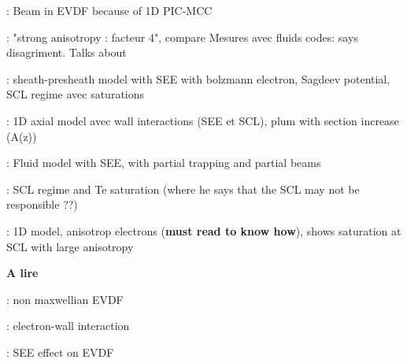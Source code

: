 \citet{sydorenko2006a} : Beam in EVDF because of 1D PIC-MCC 

\citet{raitses2006} : "strong anisotropy : facteur 4",  compare Mesures avec fluids codes: says disagriment. Talks about 

\citet{ahedo2002} : sheath-presheath model with SEE with bolzmann electron, Sagdeev potential, SCL regime avec saturations 

\citet{ahedo2003} : 1D axial model avec wall interactions (SEE et SCL), plum with section increase (A(z)) 

\citet{ahedo2005} : Fluid model with SEE, with partial trapping and partial beams

\citet{raitses2005} : SCL regime and Te saturation (where he says that the SCL may not be responsible ??)

\citet{barral2003a} : 1D model, anisotrop electrons ({\bf must read to know how}), shows saturation at SCL with large anisotropy

{\bf \Large A lire}

\citet{sydorenko2007} :  non maxwellian EVDF

\citet{raitses2005a} : electron-wall interaction

\citet{jolivet2000} : SEE effect on EVDF 